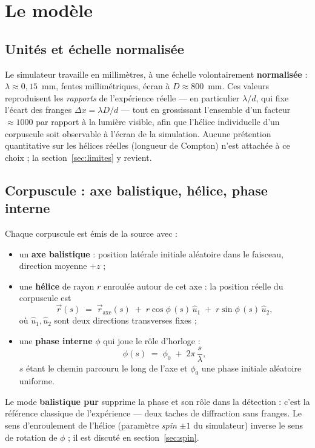 \documentclass[11pt,a4paper]{article}
\newcommand{\dx}{\Delta x}
\begin{document}
\section{Le modèle}\label{sec:model}

\subsection{Unités et échelle normalisée}

Le simulateur travaille en millimètres, à une échelle volontairement
\textbf{normalisée} : $\lambda \approx 0{,}15$~mm, fentes millimétriques, écran à
$D \approx 800$~mm. Ces valeurs reproduisent les \emph{rapports} de l'expérience
réelle --- en particulier $\lambda/d$, qui fixe l'écart des franges
$\dx = \lambda D/d$ --- tout en grossissant l'ensemble d'un facteur $\approx 1000$
par rapport à la lumière visible, afin que l'hélice individuelle d'un corpuscule
soit observable à l'écran de la simulation. Aucune prétention quantitative sur les
hélices réelles (longueur de Compton) n'est attachée à ce choix ;
la section~\ref{sec:limites} y revient.

\subsection{Corpuscule : axe balistique, hélice, phase interne}

Chaque corpuscule est émis de la source avec :
\begin{itemize}[leftmargin=1.6em,itemsep=0.15em]
  \item un \textbf{axe balistique} : position latérale initiale aléatoire dans le
        faisceau, direction moyenne $+z$ ;
  \item une \textbf{hélice} de rayon $r$ enroulée autour de cet axe : la position
        réelle du corpuscule est
        \begin{equation}\label{eq:helice}
          \vec{r}(s) \;=\; \vec{r}_{\mathrm{axe}}(s)
          \;+\; r\cos\phi\,(s)\,\hat{u}_1 \;+\; r\sin\phi\,(s)\,\hat{u}_2 ,
        \end{equation}
        où $\hat u_1, \hat u_2$ sont deux directions transverses fixes ;
  \item une \textbf{phase interne} $\phi$ qui joue le rôle d'horloge :
        \begin{equation}\label{eq:phase}
          \phi(s) \;=\; \phi_0 \;+\; 2\pi\,\frac{s}{\lambda},
        \end{equation}
        $s$ étant le chemin parcouru le long de l'axe et $\phi_0$ une phase
        initiale aléatoire uniforme.
\end{itemize}
Le mode \textbf{balistique pur} supprime la phase et son rôle dans la détection :
c'est la référence classique de l'expérience --- deux taches de diffraction sans
franges. Le sens d'enroulement de l'hélice (paramètre \emph{spin} $\pm 1$ du
simulateur) inverse le sens de rotation de $\phi$ ; il est discuté en
section~\ref{sec:spin}.
\end{document}
